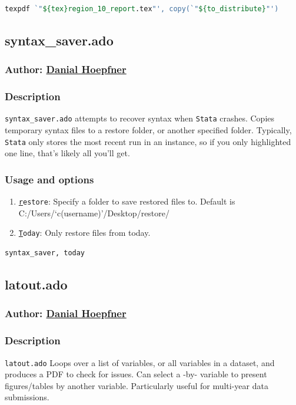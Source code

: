 {\begin{lstlisting}[language=Stata, numbers=none]
texpdf `"${tex}region_10_report.tex"', copy(`"${to_distribute}"')
\end{lstlisting}

\subsection{syntax\_saver.ado}
\subsubsection{Author: \href{mailto:dhoepfner@gibsonconsult.com}{Danial Hoepfner}}
\subsubsection{Description}
\texttt{syntax\_saver.ado} attempts to recover syntax when \texttt{Stata} crashes. Copies temporary syntax files to a restore folder, or another specified folder. Typically, \texttt{Stata} only stores the most recent run in an instance, so if you only highlighted one line, that's likely all you'll get.
\subsubsection{Usage and options}
\begin{enumerate}
\item \texttt{\underline{r}estore}: Specify a folder to save restored files to. Default is C:/Users/`c(username)'/Desktop/restore/
\item \texttt{\underline{T}oday}: Only restore files from today.
\end{enumerate}

\begin{lstlisting}[language=Stata, numbers=none]
syntax_saver, today
\end{lstlisting}


\subsection{latout.ado}
\subsubsection{Author: \href{mailto:dhoepfner@gibsonconsult.com}{Danial Hoepfner}}
\subsubsection{Description}
\texttt{latout.ado} Loops over a list of variables, or all variables in a dataset, and produces a PDF to check for issues. Can select a -by- variable to present figures/tables by another variable. Particularly useful for multi-year data submissions.
}
